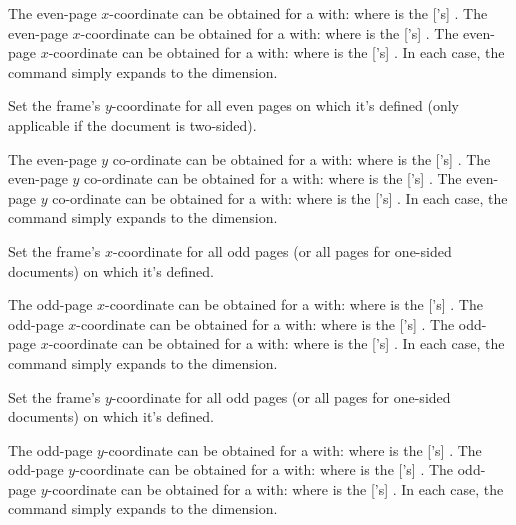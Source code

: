 \documentclass[fontsize=12pt]{scrbook}
\newcommand{\frameoptiondef}[1]{\optiondef{frame.#1}}
\begin{document}
The even-page $x$-coordinate can be obtained for a  with:
where  is the ['s] .
The even-page $x$-coordinate can be obtained for a  with:
where  is the ['s] .
The even-page $x$-coordinate can be obtained for a  with:
where  is the ['s] .
In each case, the command simply expands to the dimension.

\frameoptiondef{eveny}

Set the \gls{frame}'s $y$-coordinate for all even pages on which it's
defined (only applicable if the document is two-sided).

The even-page $y$ co-ordinate can be obtained for a  with:
where  is the ['s] .
The even-page $y$ co-ordinate can be obtained for a  with:
where  is the ['s] .
The even-page $y$ co-ordinate can be obtained for a  with:
where  is the ['s] .
In each case, the command simply expands to the dimension.

\frameoptiondef{oddx}

Set the \gls{frame}'s $x$-coordinate for all odd pages (or all pages
for one-sided documents) on which it's defined.

The odd-page $x$-coordinate can be obtained for a  with:
where  is the ['s] .
The odd-page $x$-coordinate can be obtained for a  with:
where  is the ['s] .
The odd-page $x$-coordinate can be obtained for a  with:
where  is the ['s] .
In each case, the command simply expands to the dimension.

\frameoptiondef{oddy}

Set the \gls{frame}'s $y$-coordinate for all odd pages (or all pages
for one-sided documents) on which it's defined.

The odd-page $y$-coordinate can be obtained for a  with:
where  is the ['s] .
The odd-page $y$-coordinate can be obtained for a  with:
where  is the ['s] .
The odd-page $y$-coordinate can be obtained for a  with:
where  is the ['s] .
In each case, the command simply expands to the dimension.
\end{document}
